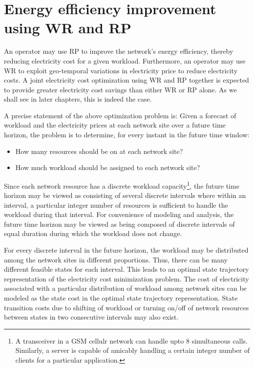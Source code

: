 \section{Energy efficiency improvement using WR and RP}
An operator may use RP to improve the network's energy efficiency, thereby reducing electricity cost for a given workload. Furthermore, an operator may use WR to exploit geo-temporal variations in electricity price to reduce electricity costs. A joint electricity cost optimization using WR and RP together is expected to provide greater electricity cost savings than either WR or RP alone. As we shall see in later chapters, this is indeed the case.

A precise statement of the above optimization problem is: Given a forecast of workload and the electricity prices at each network site over a future time horizon, the problem is to determine, for every instant in the future time window:

\begin{itemize}
\item How many resources should be on at each network site?
\item How much workload should be assigned to each network site?
\end{itemize}

Since each network resource has a discrete workload capacity\footnote{A transceiver in a GSM cellulr network can handle upto 8 simultaneous calls. Similarly, a server is capable of amicably handling a certain integer number of clients for a particular application.}, the future time horizon may be viewed as consisting of several discrete intervals where within an interval, a particular integer number of resources is sufficient to handle the workload during that interval. For convenience of modeling and analysis, the future time horizon may be viewed as being composed of discrete intervals of equal duration during which the workload does not change. 

For every discrete interval in the future horizon, the workload may be distributed among the network sites in different proportions. Thus, there can be many different feasible states for each interval. This leads to an optimal state trajectory representation of the electricity cost minimization problem. The cost of electricity associated with a particular distribution of workload among network sites can be modeled as the state cost in the optimal state trajectory representation. State transition costs due to shifting of workload or turning on/off of network resources between states in two consecutive intervals may also exist. 

